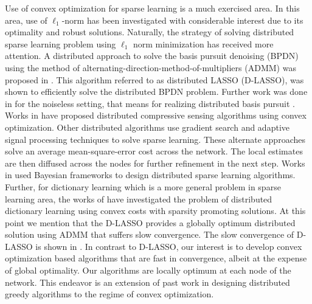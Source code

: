 \documentclass[journal]{IEEEtran}
\begin{document}
Use of convex optimization for sparse learning is a much exercised area. In this area, use of $\ell_1$-norm has been investigated with considerable interest due to its optimality and robust solutions. Naturally, the strategy of solving distributed sparse learning problem using $\ell_1$ norm minimization has received more attention. A distributed approach to solve the basis pursuit denoising (BPDN) \cite{Chen_Donoho_Saunders_1998} using the method of alternating-direction-method-of-multipliers (ADMM) was proposed in \cite{Giannakis_Distributed_sparse_linear_regression_TSP_2010}. This algorithm referred to as distributed LASSO (D-LASSO), was shown to efficiently solve the distributed BPDN problem. Further work was done in \cite{Mota_Distributed_Basis_Pursuit_2012} for the noiseless setting, that means for realizing distributed basis pursuit \cite{Chen_Donoho_Saunders_1998}. Works in \cite{Duarte_Baraniuk_2005_Distributed_CS_Asilomar, Baron_DCS_2009} have proposed distributed compressive sensing algorithms using convex optimization. Other distributed algorithms use gradient search and adaptive signal processing techniques  \cite{Sergios_adaptive_algorithm_distributed_learning_TSP_2012, Li_Distributed_RLS_over_networks_TSP_2014, Sayed_sparse_distributed_learning_diffusion_TSP_2013} to solve sparse learning. These alternate approaches solve an average mean-square-error cost across the network. The local estimates are then diffused across the nodes for further refinement in the next step. Works in\cite{Eldar_DAMP_GlobalSIP_2014, Chen_decentralized_bayesian_DCS_TWC_2016} used Bayesian frameworks to design distributed sparse learning algorithms. Further, for dictionary learning which is a more general problem in sparse learning area, the works of \cite{Kreutz_Delgado_2003, Liang_distributed_DL_in_sensor_networks_2014} have investigated the problem of distributed dictionary learning using convex costs with sparsity promoting solutions. At this point we mention that the D-LASSO \cite{Giannakis_Distributed_sparse_linear_regression_TSP_2010} provides a globally optimum distributed solution using ADMM that suffers slow convergence. The slow convergence of D-LASSO is shown in \cite{Sergios_greedy_sparsity_algorithm_distributed_learning_TSP_2015}. In contrast to D-LASSO, our interest is to develop convex optimization based algorithms that are fast in convergence, albeit at the expense of global optimality. Our algorithms are locally optimum at each node of the network. This endeavor is an extension of past work in designing distributed greedy algorithms \cite{Zaki_DHTP_2017, Zaki_Venkitaraman_Chatterjee_Rasmussen_GreedySparseLearningOverNetwork_TSIPN_2017} to the regime of convex optimization.
\end{document}
